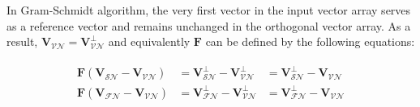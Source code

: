 In Gram-Schmidt algorithm, the very first vector in the input vector array serves as a reference vector and remains unchanged in the orthogonal vector array. As a result, $\mathbf{V}_{\mathcal{VN}} = \mathbf{V}_{\mathcal{VN}}^{\perp}$ and equivalently $\mathbf{F}$ can be defined by the following equations:

\begin{align}
\label{eq:constraints}
\begin{aligned}
\mathbf{F}(\mathbf{V}_{\mathcal{SN}} - \mathbf{V}_{\mathcal{VN}}) &= \mathbf{V}_{\mathcal{SN}}^{\perp} - \mathbf{V}_{\mathcal{VN}}^{\perp} &= \mathbf{V}_{\mathcal{SN}}^{\perp} - \mathbf{V}_{\mathcal{VN}}\\
\mathbf{F}(\mathbf{V}_{\mathcal{FN}} - \mathbf{V}_{\mathcal{VN}}) &= \mathbf{V}_{\mathcal{FN}}^{\perp} - \mathbf{V}_{\mathcal{VN}}^{\perp} &= \mathbf{V}_{\mathcal{FN}}^{\perp} - \mathbf{V}_{\mathcal{VN}}
\end{aligned}
\end{align}

